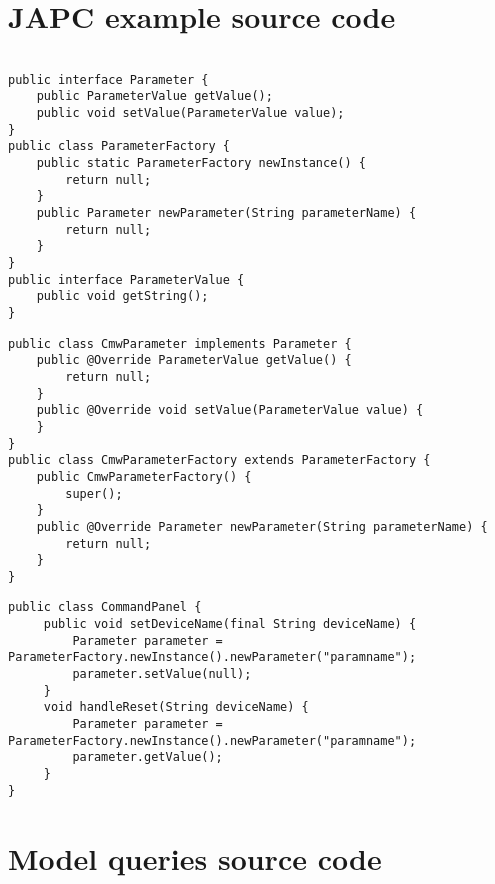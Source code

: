 \appendix
\chapter{JAPC example source code}
\label{examplesource}

\begin{lstlisting}[caption=JAPC classes (package name: cern.japc)]

public interface Parameter {
    public ParameterValue getValue();
    public void setValue(ParameterValue value);
}
public class ParameterFactory {
    public static ParameterFactory newInstance() {
        return null;
    }
    public Parameter newParameter(String parameterName) {
        return null;
    }
}
public interface ParameterValue {	
    public void getString();
}
\end{lstlisting}

\begin{lstlisting}[caption=JAPC extension classes (package name:
cern.japc.ext.cmw)]
public class CmwParameter implements Parameter {
    public @Override ParameterValue getValue() {
        return null;
    }
    public @Override void setValue(ParameterValue value) {
    }
}
public class CmwParameterFactory extends ParameterFactory {
    public CmwParameterFactory() {
        super();
    }
    public @Override Parameter newParameter(String parameterName) {    
        return null;
    }
}
\end{lstlisting}

\begin{lstlisting}[caption=User project classes (package name:
cern.accsoft.gui.alarms)]
public class CommandPanel {
     public void setDeviceName(final String deviceName) {
         Parameter parameter = ParameterFactory.newInstance().newParameter("paramname");
         parameter.setValue(null);
     }
     void handleReset(String deviceName) {
         Parameter parameter = ParameterFactory.newInstance().newParameter("paramname");
         parameter.getValue();
     }
}
\end{lstlisting}

\chapter{Model queries source code}
\label{examplequeries}



